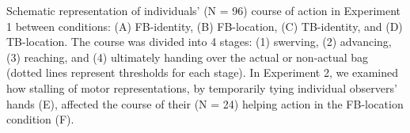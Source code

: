 \documentclass[12pt]{extarticle}
\begin{document}
\begin{multicols*}{3}
Schematic representation of individuals’ (N = 96) course of action in Experiment 1 between conditions: (A) FB-identity, (B) FB-location, (C) TB-identity, and (D) TB-location. The course was divided into 4 stages: (1) swerving, (2) advancing, (3) reaching, and (4) ultimately handing over the actual or non-actual bag (dotted lines represent thresholds for each stage). In Experiment 2, we examined how stalling of motor representations, by temporarily tying individual observers’ hands (E), affected the course of their (N = 24) helping action in the FB-location condition (F).



\footnotesize


\end{multicols*}
\end{document}

